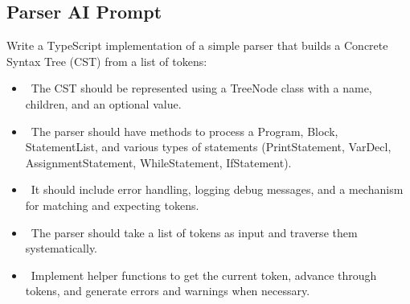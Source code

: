 \documentclass[12pt]{article}
\begin{document}
\subsection{Parser AI Prompt}
Write a TypeScript implementation of a simple parser that builds a Concrete Syntax Tree (CST) from a list of tokens: 
\begin{itemize}
    \item \ The CST should be represented using a TreeNode class with a name, children, and an optional value.
    \item \ The parser should have methods to process a Program, Block, StatementList, and various types of statements (PrintStatement, VarDecl, AssignmentStatement, WhileStatement, IfStatement).
    \item \ It should include error handling, logging debug messages, and a mechanism for matching and expecting tokens.
    \item \ The parser should take a list of tokens as input and traverse them systematically.
    \item \ Implement helper functions to get the current token, advance through tokens, and generate errors and warnings when necessary.
\end{itemize}
\end{document}
